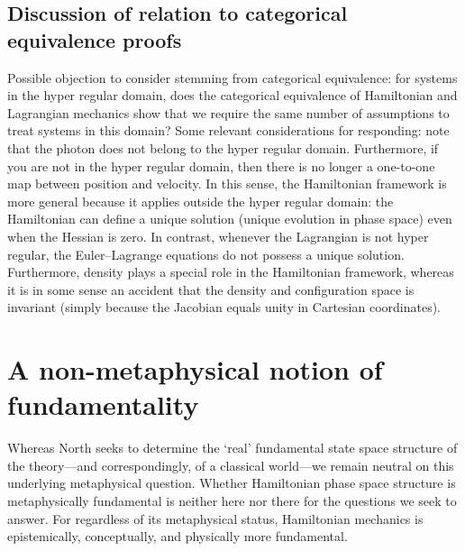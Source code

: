 \documentclass[letterpaper]{article}
\begin{document}
\subsection{Discussion of relation to categorical equivalence proofs}

Possible objection to consider stemming from categorical equivalence: for systems in the hyper regular domain, does the categorical equivalence of Hamiltonian and Lagrangian mechanics show that we require the same number of assumptions to treat systems in this domain? 
Some relevant considerations for responding: note that the photon does not belong to the hyper regular domain. Furthermore, if you are not in the hyper regular domain, then there is no longer a one-to-one map between position and velocity. In this sense, the Hamiltonian framework is more general because it applies outside the hyper regular domain: the Hamiltonian can define a unique solution (unique evolution in phase space) even when the Hessian is zero. In contrast, whenever the Lagrangian is not hyper regular, the Euler--Lagrange equations do not possess a unique solution. Furthermore, density plays a special role in the Hamiltonian framework, whereas it is in some sense an accident that the density and configuration space is invariant (simply because the Jacobian equals unity in Cartesian coordinates).

\section{A non-metaphysical notion of fundamentality}



Whereas North \parencites*[76]{North2009} seeks to determine the `real' fundamental state space structure of the theory---and correspondingly, of a classical world---we remain neutral on this underlying metaphysical question. Whether Hamiltonian phase space structure is metaphysically fundamental is neither here nor there for the questions we seek to answer. For regardless of its metaphysical status, Hamiltonian mechanics is epistemically, conceptually, and physically more fundamental.
\end{document}
